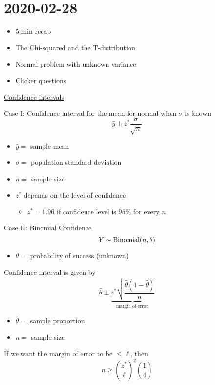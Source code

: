 \section{2020-02-28}
\begin{itemize}
    \item 5 min recap
    \item The Chi-squared and the T-distribution
    \item Normal problem with unknown variance
    \item Clicker questions
\end{itemize}
\underline{Confidence intervals}

Case I\@: Confidence interval for the mean for normal when $ \sigma $ is known
\[ \bar{y}\pm z^* \frac{\sigma}{\sqrt{n}}  \]
\begin{itemize}
    \item $ \bar{y}= $ sample mean
    \item $ \sigma= $ population standard deviation
    \item $ n= $ sample size
    \item $ z^* $ depends on the level of confidence
          \begin{itemize}
              \item $ z^*=1.96 $ if confidence level is $ 95\% $ for every $ n $
          \end{itemize}
\end{itemize}

Case II\@: Binomial Confidence
\[ Y \thicksim \operatorname{Binomial}(n,\theta) \]
\begin{itemize}
    \item $ \theta= $ probability of success (unknown)
\end{itemize}
Confidence interval is given by
\[ \hat{\theta}\pm \underbrace{z^* \sqrt{\frac{\hat{\theta}\left( 1-\hat{\theta} \right)}{n}}}_{\text{
            margin of error
        }} \]
\begin{itemize}
    \item $ \hat{\theta}= $ sample proportion
    \item $ n= $ sample size
\end{itemize}
If we want the margin of error to be $ \leqslant \ell $, then
\[ n\geqslant \left( \frac{z^*}{\ell} \right)^2\left( \frac{1}{4} \right) \]

